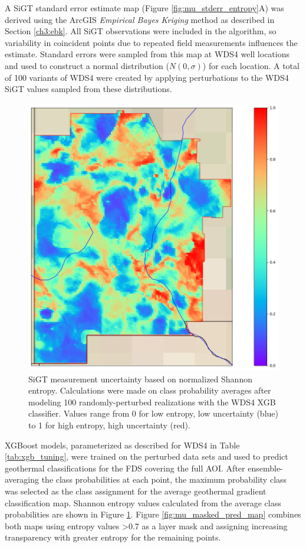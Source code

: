 A SiGT standard error estimate map (Figure \ref{fig:mu_stderr_entropy}A) was derived using the ArcGIS \textit{Empirical Bayes Kriging} method as described in Section \ref{ch3:ebk}. All SiGT observations were included in the algorithm, so variability in coincident points due to repeated field measurements influences the estimate. Standard errors were sampled from this map at WDS4 well locations and used to construct a normal distribution ($N(0,\sigma)$) for each location. A total of 100 variants of WDS4 were created by applying perturbations to the WDS4 SiGT values sampled from these distributions. 

\begin{figure}[!htp]
\centering
\includegraphics[width=.8\textwidth]{templates/images/Figure-MU_Entropy_Map.png}
\caption[SiGT measurement uncertainty map]
{SiGT measurement uncertainty based on normalized Shannon entropy. Calculations were made on class probability averages after modeling 100 randomly-perturbed realizations with the WDS4 XGB classifier. Values range from 0 for low entropy, low uncertainty (blue) to 1 for high entropy, high uncertainty (red).}
\label{fig:mu_entropy_map}
\end{figure}

XGBoost models, parameterized as described for WDS4 in Table \ref{tab:xgb_tuning}, were trained on the perturbed data sets and used to predict geothermal classifications for the FDS covering the full AOI. After ensemble-averaging the class probabilities at each point, the maximum probability class was selected as the class assignment for the average geothermal gradient classification map. Shannon entropy values calculated from the average class probabilities are shown in Figure \ref{fig:mu_entropy_map}. Figure \ref{fig:mu_masked_pred_map} combines both maps using entropy values >0.7 as a layer mask and assigning increasing transparency with greater entropy for the remaining points.

